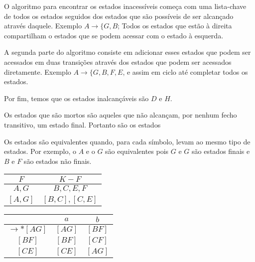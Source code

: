 \documentclass[]{article}
\begin{document}
O algoritmo para encontrar os estados inacessíveis começa com uma lista-chave de todos os estados seguidos dos estados que são possíveis de ser alcançado através daquele. Exemplo $A \to \{ G, B$; Todos os estados que estão à direita compartilham o estados que se podem acessar com o estado à esquerda.

A segunda parte do algoritmo consiste em adicionar esses estados que podem ser acessados em duas transições através dos estados que podem ser acessados diretamente. Exemplo $A \to \{ G, B,F, E$, e assim em ciclo até completar todos os estados.

Por fim, temos que os estados inalcançáveis são $D$ e $H$.

Os estados que são mortos são aqueles que não alcançam, por nenhum fecho transitivo, um estado final. Portanto são os estados

Os estados são equivalentes quando, para cada símbolo, levam ao mesmo tipo de estados. Por exemplo, o $A$ e o $G$ são equivalentes pois $G$ e $G$ são estados finais e $B$ e $F$ são estados não finais.

\begin{minipage}[t]{0.43\textwidth}
\begin{tabular}{|c|c|} %
            \toprule %
            $F$ & $K-F $\\
            \midrule %
		$A,G$ & $B,C,E,F$\\
		$[A,G]$ & $[B,C],[C,E]$\\
            \bottomrule %
        \end{tabular}
\end{minipage} 
\hfill
\begin{minipage}[t]{0.43\textwidth}
\begin{tabular}{|c|c|c|} %
            \toprule %
             & $a$ & $b$\\
            \midrule %
		$\to *[AG]$ & $[AG]$ & $[BF]$\\
		$[BF]$ & $[BF]$ & $[CF]$\\
		$[CE]$ & $[CE]$ & $[AG]$\\
		
            \bottomrule %
        \end{tabular}
\end{minipage} 
\end{document}

